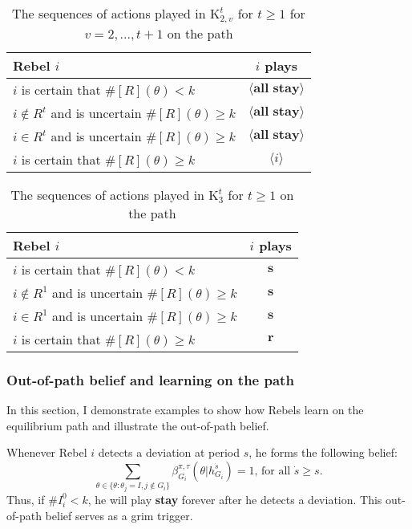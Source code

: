 \documentclass[12pt,letter]{article}
\newcommand{\Kappa}{\mathrm{K}}
\theoremstyle{definition}
\theoremstyle{remark}
\theoremstyle{claim}
\begin{document}
\begin{table}[!htbp]
\caption{The sequences of actions played in $\Kappa^t_{2,v}$ for $t\geq 1$ for $v=2,...,t+1$ on the path}
\label{Table_cdt2t}
\begin{center}
\begin{tabular}{l c}
Rebel $i$ 	 	&  	$i$ plays		 \\
\hline
\hline
$i$ is certain that $\#[R](\theta)<k$ 	& 	$\langle \textbf{all stay} \rangle$	\\
$i\notin R^{t}$ and is uncertain $\#[R](\theta)\geq k$	& 	$\langle \textbf{all stay} \rangle$	\\
$i\in R^{t}$ and is uncertain $\#[R](\theta)\geq k$ &  $\langle \textbf{all stay} \rangle$  \\
$i$ is certain that $\#[R](\theta)\geq k$ &  $\langle i \rangle$  \\
\hline
\end{tabular}
\end{center}
\end{table}


\begin{table}[!htbp]
\caption{The sequences of actions played in $\Kappa^t_{3}$ for $t\geq 1$ on the path}
\label{Table_cdt3v}
\begin{center}
\begin{tabular}{l c}
Rebel $i$ 	 	&  	$i$ plays		 \\
\hline
\hline
$i$ is certain that $\#[R](\theta)<k$ 	& 	$\textbf{s}$	\\
$i\notin R^{1}$ and is uncertain $\#[R](\theta)\geq k$	& 	$ \textbf{s} $	\\
$i\in R^{1}$ and is uncertain $\#[R](\theta)\geq k$ &  $ \textbf{s} $  \\
$i$ is certain that $\#[R](\theta)\geq k$ &  $ \textbf{r} $  \\
\hline
\end{tabular}
\end{center}
\end{table}
\clearpage






\subsubsection{Out-of-path belief and learning on the path}
In this section, I demonstrate examples to show how Rebels learn on the equilibrium path and illustrate the out-of-path belief. 
 
Whenever Rebel $i$ detects a deviation at period $s$, he forms the following belief: 
\begin{equation}
\label{eq_grim_trigger}
\sum_{\theta \in \{\theta:\theta_j=I,j\notin G_i\}}\beta^{\pi,\tau}_{G_i}({\theta}|h^{\dot{s}}_{G_i})=1 \text{, for all $\dot{s}\geq s$}.
\end{equation}
Thus, if $\# I^0_i<k$, he will play \textbf{stay} forever after he detects a deviation. This out-of-path belief serves as a grim trigger. 
\end{document}
